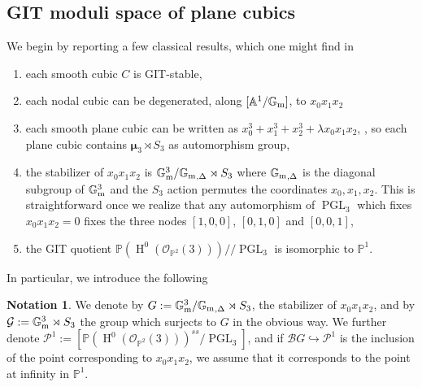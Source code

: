\documentclass{amsart}
\newcommand{\bA}{\mathbb{A}}
\newcommand{\bG}{\mathbb{G}}
\newcommand{\bP}{\mathbb{P}}
\newcommand{\oH}{\operatorname{H}}
\newcommand{\sP}{\mathscr{P}}
\newcommand{\cB}{\mathcal{B}}
\newcommand{\cG}{\mathcal{G}}
\newcommand{\cO}{\mathcal{O}}
\newcommand{\Gm}{\bG_{{\rm m}}}
\newcommand{\PGL}{\operatorname{PGL}}
\newcommand{\bmu}{\bm{\mu}}
\theoremstyle{definition}
\newtheorem{Notation}[theorem]{Notation}
\theoremstyle{definition}
\begin{document}
{\subsection{GIT moduli space of plane cubics}We begin by reporting a few classical results, which one might find in \cites{MFK, ascher2023moduli}
\begin{enumerate}
    \item each smooth cubic $C$ is GIT-stable,
    \item each nodal cubic can be degenerated, along $[\bA^1/\Gm]$, to $x_0x_1x_2$
    \item each smooth plane cubic can be written as $x_0^3+ x_1^3 + x_2^3 + \lambda x_0x_1x_2$, \cites{nakamura2004planar, hesse1897ludwig}, so each plane cubic contains $\bmu_3\rtimes S_3$ as automorphism group,
    \item the stabilizer of $x_0x_1x_2$ is $\Gm^3/{\Gm}_{, \Delta}\rtimes S_3$ where ${\Gm}_{, \Delta}$ is the diagonal subgroup of $\Gm^3$ and the $S_3$ action permutes the coordinates $x_0, x_1, x_2$. This is straightforward once we realize that any automorphism of $\PGL_3$ which fixes $x_0x_1x_2=0$ fixes the three nodes $[1,0,0]$, $[0,1,0]$ and $[0,0,1]$,
    \item the GIT quotient $\bP(\oH^0(\cO_{\bP^2}(3)))/\!\!/\PGL_3$ is isomorphic to $\bP^1$.
\end{enumerate}
In particular, we introduce the following
\begin{Notation}
    We denote by $G:=\Gm^3/{\Gm}_{, \Delta}\rtimes S_3$, the stabilizer of $x_0x_1x_2$, and by $\cG:=\Gm^3\rtimes S_3$ the group which surjects to $G$ in the obvious way. We further denote $\sP^1:= [\bP(\oH^0(\cO_{\bP^2}(3)))^{ss}/\PGL_3]$, and if $\cB G\hookrightarrow \sP^1$ is the inclusion of the point corresponding to $x_0x_1x_2$, we assume that it corresponds to the point at infinity in $\bP^1$.
\end{Notation}

}
\end{document}
